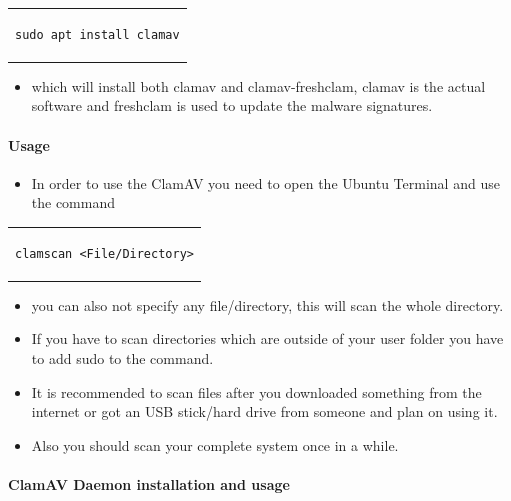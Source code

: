 \documentclass[a4paper,10pt]{article}
\begin{document}
\begin{center}
\begin{tabular}{c}
\begin{lstlisting}
sudo apt install clamav
\end{lstlisting}
\end{tabular}
\end{center}

\begin{itemize}[leftmargin=*]
\item which will install both clamav and clamav-freshclam, clamav is the actual software and freshclam is used to update the malware signatures.
\end{itemize}
\paragraph{Usage}

\begin{itemize}[leftmargin=*]
\item In order to use the ClamAV you need to open the Ubuntu Terminal and use the command
\end{itemize}

\begin{center}
\begin{tabular}{c}
\begin{lstlisting}
clamscan <File/Directory>
\end{lstlisting}
\end{tabular}
\end{center}


\begin{itemize}[leftmargin=*]
\item you can also not specify any file/directory, this will scan the whole directory.
\item If you have to scan directories which are outside of your user folder you have to add sudo to the command.
\item It is recommended to scan files after you downloaded something from the internet or got an USB stick/hard drive from someone and plan on using it.
\item Also you should scan your complete system once in a while.
\end{itemize}


\paragraph{ClamAV Daemon installation and usage}
\end{document}
